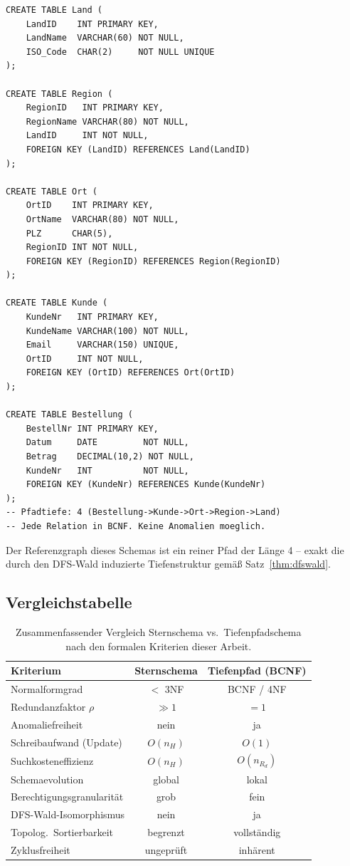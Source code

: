 ﻿\documentclass[12pt,a4paper]{article}
\theoremstyle{definition}
\theoremstyle{remark}
\begin{document}
\begin{lstlisting}[caption={Korrekte Tiefenpfadstruktur: BCNF-konformes Schema},label=lst:tief]
CREATE TABLE Land (
    LandID    INT PRIMARY KEY,
    LandName  VARCHAR(60) NOT NULL,
    ISO_Code  CHAR(2)     NOT NULL UNIQUE
);

CREATE TABLE Region (
    RegionID   INT PRIMARY KEY,
    RegionName VARCHAR(80) NOT NULL,
    LandID     INT NOT NULL,
    FOREIGN KEY (LandID) REFERENCES Land(LandID)
);

CREATE TABLE Ort (
    OrtID    INT PRIMARY KEY,
    OrtName  VARCHAR(80) NOT NULL,
    PLZ      CHAR(5),
    RegionID INT NOT NULL,
    FOREIGN KEY (RegionID) REFERENCES Region(RegionID)
);

CREATE TABLE Kunde (
    KundeNr   INT PRIMARY KEY,
    KundeName VARCHAR(100) NOT NULL,
    Email     VARCHAR(150) UNIQUE,
    OrtID     INT NOT NULL,
    FOREIGN KEY (OrtID) REFERENCES Ort(OrtID)
);

CREATE TABLE Bestellung (
    BestellNr INT PRIMARY KEY,
    Datum     DATE         NOT NULL,
    Betrag    DECIMAL(10,2) NOT NULL,
    KundeNr   INT          NOT NULL,
    FOREIGN KEY (KundeNr) REFERENCES Kunde(KundeNr)
);
-- Pfadtiefe: 4 (Bestellung->Kunde->Ort->Region->Land)
-- Jede Relation in BCNF. Keine Anomalien moeglich.
\end{lstlisting}

Der Referenzgraph dieses Schemas ist ein reiner Pfad der Länge 4 --
exakt die durch den DFS-Wald induzierte Tiefenstruktur gemäß
Satz~\ref{thm:dfswald}.

\subsection{Vergleichstabelle}

\begin{table}[H]
\centering
\renewcommand{\arraystretch}{1.35}
\begin{tabular}{lcc}
\toprule
\textbf{Kriterium} & \textbf{Sternschema} & \textbf{Tiefenpfad (BCNF)} \\
\midrule
Normalformgrad            & $<$ 3NF   & BCNF / 4NF \\
Redundanzfaktor $\rho$    & $\gg 1$   & $= 1$ \\
Anomaliefreiheit          & nein      & ja \\
Schreibaufwand (Update)   & $O(n_H)$  & $O(1)$ \\
Suchkosteneffizienz       & $O(n_H)$  & $O(n_{R_d})$ \\
Schemaevolution           & global    & lokal \\
Berechtigungsgranularität & grob      & fein \\
DFS-Wald-Isomorphismus    & nein      & ja \\
Topolog.\ Sortierbarkeit  & begrenzt  & vollständig \\
Zyklusfreiheit            & ungeprüft & inhärent \\
\bottomrule
\end{tabular}
\caption{Zusammenfassender Vergleich Sternschema vs.\ Tiefenpfadschema
nach den formalen Kriterien dieser Arbeit.}
\label{tab:vergleich}
\end{table}
\end{document}
